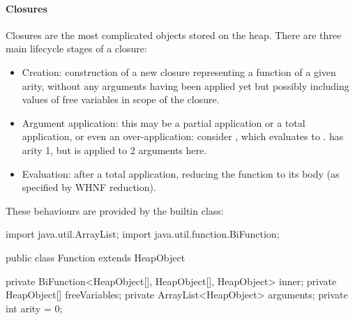 \documentclass[dissertation.tex]{subfiles}
\begin{document}
{{{{            }
            \paragraph*{Closures}\label{sec:closures}
            {

                Closures are the most complicated objects stored on the heap. There are three main lifecycle stages of a
                closure:

                \begin{itemize}
                \item
                {
                    Creation: construction of a new closure representing a function of a given arity, without any
                    arguments having been applied yet but possibly including values of free variables in scope of the
                    closure.
                }
                \item
                {
                    
                    Argument application: this may be a partial application or a total application, or even an
                    over-application: consider , which evaluates to .  has
                    arity 1, but is applied to 2 arguments here.

                }
                \item
                {
                    Evaluation: after a total application, reducing the function to its body (as specified by WHNF
                    reduction).
                }
                \end{itemize}

                These behaviours are provided by the  builtin class:

                \begin{javafigure}
                import java.util.ArrayList;
                import java.util.function.BiFunction;
                                
                public class Function extends HeapObject {
                    private BiFunction<HeapObject[], HeapObject[], HeapObject> inner;
                    private HeapObject[] freeVariables;
                    private ArrayList<HeapObject> arguments;
                    private int arity = 0;
                                
}
\end{javafigure}}}}}
\end{document}
